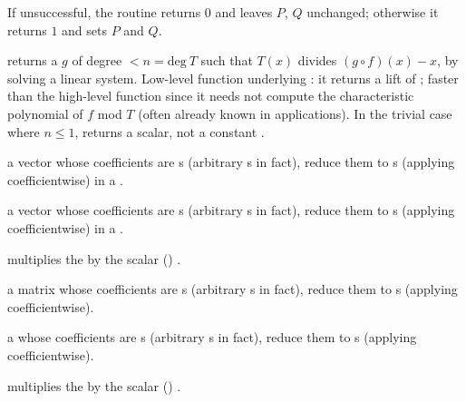 \noindent If unsuccessful, the routine returns $0$ and leaves $P$, $Q$
unchanged; otherwise it returns $1$ and sets $P$ and $Q$.

 returns a  $g$ of degree $< n
= \text{deg}~T$ such that $T(x)$ divides $(g \circ f)(x) - x$, by solving a
linear system. Low-level function underlying : it returns a
lift of \kbd[modreverse(f,T)]; faster than the high-level function since it
needs not compute the characteristic polynomial of $f$ mod $T$ (often already
known in applications). In the trivial case where $n \leq 1$, returns a
scalar, not a constant .


  a vector whose
coefficients are s (arbitrary s in fact), reduce them to
s (applying  coefficientwise) in a .

  a vector whose
coefficients are s (arbitrary s in fact), reduce them to
s (applying  coefficientwise) in a .

  multiplies the
   by the scalar () .


  a matrix whose
coefficients are s (arbitrary s in fact), reduce them to
s (applying  coefficientwise).



  a  whose
coefficients are s (arbitrary s in fact), reduce them to
s (applying  coefficientwise).


 multiplies the 
 by the scalar () .





